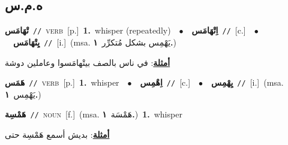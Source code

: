 \documentclass[10pt,a4paper,twoside]{article} %
\begin{document}
\begin{multicols}{2}
\vspace{-3mm}
\subsection*{\color{blue}\foreignlanguage{arabic}{ه.م.س}\color{blue}{}} 

{\setlength\topsep{0pt}\textbf{\foreignlanguage{arabic}{تْهَامَس}}\ {\color{gray}\texttt{//}\color{black}}\ \textsc{verb}\ [p.]\ \textbf{1.}~whisper (repeatedly)\ \ $\bullet$\ \ \setlength\topsep{0pt}\textbf{\foreignlanguage{arabic}{اِتْهَامَس}}\ {\color{gray}\texttt{//}\color{black}}\ [c.]\ \ $\bullet$\ \ \setlength\topsep{0pt}\textbf{\foreignlanguage{arabic}{يِتْهَامَس}}\ {\color{gray}\texttt{//}\color{black}}\ [i.]\ \color{gray}(msa. \foreignlanguage{arabic}{يَهْمِس بشكل مُتكرِّر}~\foreignlanguage{arabic}{\textbf{١.}})\color{black}\  \begin{flushright}\color{gray}\foreignlanguage{arabic}{\textbf{\underline{\foreignlanguage{arabic}{أمثلة}}}: في ناس بالصف بيتْهامَسوا وعاملين دوشة}\end{flushright}\color{black}} \vspace{2mm}

{\setlength\topsep{0pt}\textbf{\foreignlanguage{arabic}{هَمَس}}\ {\color{gray}\texttt{//}\color{black}}\ \textsc{verb}\ [p.]\ \textbf{1.}~whisper\ \ $\bullet$\ \ \setlength\topsep{0pt}\textbf{\foreignlanguage{arabic}{اِهْمِس}}\ {\color{gray}\texttt{//}\color{black}}\ [c.]\ \ $\bullet$\ \ \setlength\topsep{0pt}\textbf{\foreignlanguage{arabic}{يِهْمِس}}\ {\color{gray}\texttt{//}\color{black}}\ [i.]\ \color{gray}(msa. \foreignlanguage{arabic}{يَهْمِس}~\foreignlanguage{arabic}{\textbf{١.}})\color{black}\ } \vspace{2mm}

{\setlength\topsep{0pt}\textbf{\foreignlanguage{arabic}{هَمْسِة}}\ {\color{gray}\texttt{//}\color{black}}\ \textsc{noun}\ [f.]\ \color{gray}(msa. \foreignlanguage{arabic}{هَمْسَة}~\foreignlanguage{arabic}{\textbf{١.}})\color{black}\ \textbf{1.}~whisper\  \begin{flushright}\color{gray}\foreignlanguage{arabic}{\textbf{\underline{\foreignlanguage{arabic}{أمثلة}}}: بديش أسمع هَمْسِة حتى}\end{flushright}\color{black}} \vspace{2mm}


\end{multicols}
\end{document}
